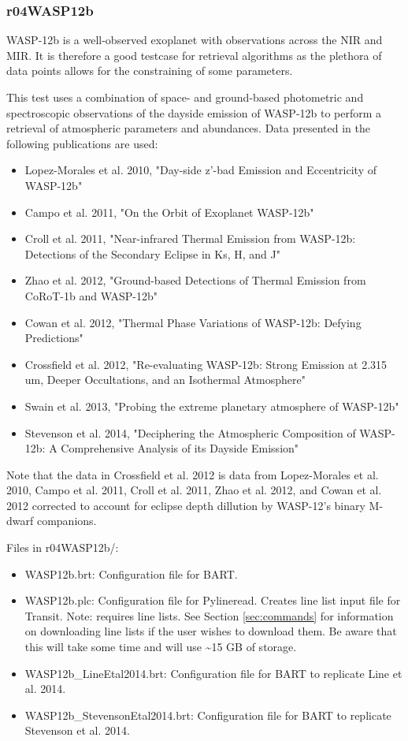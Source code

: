 \documentclass[letterpaper, 12pt]{article}
\begin{document}
\subsubsection{r04WASP12b}
WASP-12b is a well-observed exoplanet with observations across the NIR and MIR. 
It is therefore a good testcase for retrieval algorithms as the plethora of 
data points allows for the constraining of some parameters. 

This test uses a combination of space- and ground-based photometric and 
spectroscopic observations of the 
dayside emission of WASP-12b to perform a retrieval of atmospheric parameters 
and abundances. Data presented in the following publications are used:
\begin{itemize} \itemsep0pt
  \item Lopez-Morales et al. 2010, "Day-side z'-bad Emission and Eccentricity 
        of WASP-12b"
  \item Campo et al. 2011, "On the Orbit of Exoplanet WASP-12b"
  \item Croll et al. 2011, "Near-infrared Thermal Emission from WASP-12b: 
        Detections of the Secondary Eclipse in Ks, H, and J"
  \item Zhao et al. 2012, "Ground-based Detections of Thermal Emission 
        from CoRoT-1b and WASP-12b"
  \item Cowan et al. 2012, "Thermal Phase Variations of WASP-12b: Defying 
        Predictions"
  \item Crossfield et al. 2012, "Re-evaluating WASP-12b: Strong Emission 
        at 2.315 um, Deeper Occultations, and an Isothermal Atmosphere"
  \item Swain et al. 2013, "Probing the extreme planetary atmosphere 
        of WASP-12b"
  \item Stevenson et al. 2014, "Deciphering the Atmospheric Composition 
        of WASP-12b: A Comprehensive Analysis of its Dayside Emission"
\end{itemize}

Note that the data in Crossfield et al. 2012 is data from 
Lopez-Morales et al. 2010, Campo et al. 2011, Croll et al. 2011, 
Zhao et al. 2012, and Cowan et al. 2012 corrected to account for eclipse 
depth dillution by WASP-12's binary M-dwarf companions.

Files in r04WASP12b/:
\begin{itemize} \itemsep0pt
  \item WASP12b.brt: Configuration file for BART.
  \item WASP12b.plc: Configuration file for Pylineread. Creates 
        line list input file for Transit. Note: requires line lists. See 
        Section \ref{sec:commands} for information on downloading line lists if 
        the user wishes to download them. Be aware that this will take some 
        time and will use {\sim}15 GB of storage.
  \item WASP12b_LineEtal2014.brt: Configuration file for BART to replicate 
        Line et al. 2014.
  \item WASP12b_StevensonEtal2014.brt: Configuration file for BART to 
        replicate Stevenson et al. 2014.
\end{itemize}
\end{document}
